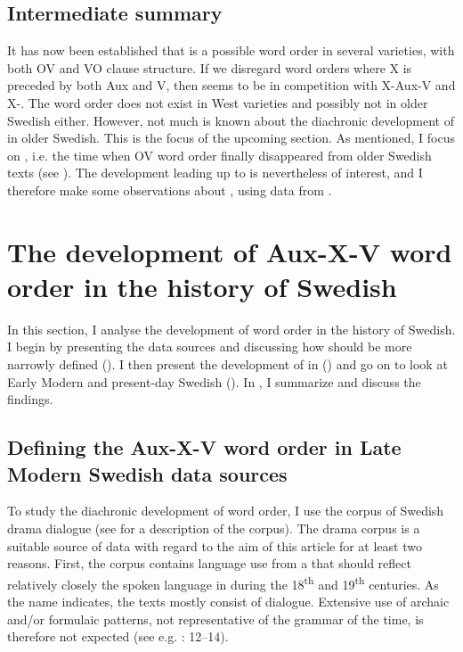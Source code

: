 \documentclass[output=paper, colorlinks, citecolor=brown]{langscibook}
\begin{document}
\subsection{Intermediate summary}\label{sec:sangfelt:3.4}

It has now been established that  is a possible word order in several  varieties, with both OV and VO clause structure. If we disregard word orders where X is preceded by both Aux and V, then  seems to be in competition with X-Aux-V and X-. The word order  does not exist in West  varieties and possibly not in older Swedish either. However, not much is known about the diachronic development of  in older Swedish. This is the focus of the upcoming section. As mentioned, I focus on , i.e. the time when OV word order finally disappeared from older Swedish texts (see \citealt{Platzack1983,Petzell2011,Sangfelt2019}). The development leading up to  is nevertheless of interest, and I therefore make some observations about , using data from \citet{Sangfelt2019}.

\section{The development of Aux-X-V word order in the history of Swedish}\label{sec:sangfelt:4}

In this section, I analyse the development of  word order in the history of Swedish. I begin by presenting the data sources and discussing how  should be more narrowly defined (). I then present the development of  in  () and go on to look at Early Modern and present-day Swedish (). In , I summarize and discuss the findings.

\subsection{Defining the Aux-X-V word order in Late Modern Swedish data sources}\label{sec:sangfelt:4.1}

To study the diachronic development of  word order, I use the corpus of Swedish drama dialogue (see \citealt{MarttalaStromquist2001} for a description of the corpus). The drama corpus is a suitable source of data with regard to the aim of this article for at least two reasons. First, the corpus contains language use from a  that should reflect relatively closely the spoken language in  during the 18\textsuperscript{th} and 19\textsuperscript{th} centuries. As the name indicates, the texts mostly consist of dialogue. Extensive use of archaic and/or formulaic patterns, not representative of the grammar of the time, is therefore not expected (see e.g. \citealt{Fischer2007}: 12–14).
\end{document}
